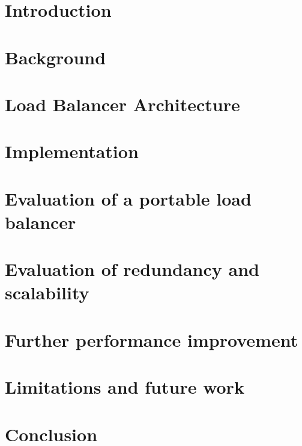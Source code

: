 
\graphicspath{{Manuscript/}}

\chapter{Introduction}\label{chapter:introduction}


\chapter{Background}\label{chapter:background}



\chapter{Load Balancer Architecture}\label{chapter:architecture}


\chapter{Implementation}\label{chapter:implemetation}


\chapter{Evaluation of a portable load balancer}\label{chapter:portablelb}


\chapter{Evaluation of redundancy and scalability}\label{chapter:redundancy}


\chapter{Further performance improvement}\label{chapter:performance}


\chapter{Limitations and future work}\label{chapter:futurework}
%

\chapter{Conclusion}\label{chapter:conclusion}




